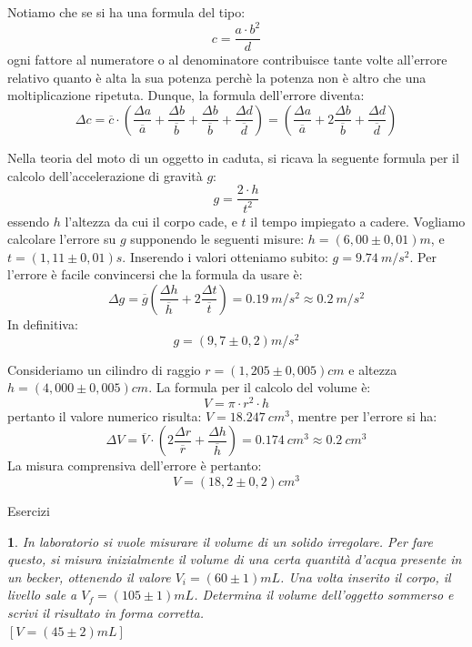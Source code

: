 \documentclass[12pt,a4paper,oneside]{book}
\makeatletter
\newcounter{testexample} %
\renewcommand{\subsection}{\@startsection {subsection}{2}{\z@}
{-3ex \@plus -0.1ex \@minus -.4ex}
{0.5ex \@plus.2ex }
{\color[rgb]{0.141,0.596,0.749}\normalfont\sffamily\bfseries}}
\theoremstyle{esercizio}
\newtheorem{esercizio}{}
\makeatother
\begin{document}
Notiamo che se si ha una formula del tipo:
\[
c=\frac{a\cdot b^2}{d}
\]
ogni fattore al numeratore o al denominatore contribuisce tante volte all'errore relativo quanto è alta la sua potenza perchè la potenza non è altro che una moltiplicazione ripetuta. Dunque, la formula dell'errore diventa:
\[
\Delta c= \overline{c} \cdot \left(\frac{\Delta a}{\overline{a}}+\frac{\Delta b}{\overline{b}} +\frac{\Delta b}{\overline{b}}  +\frac{\Delta d}{\overline{d}} \right)= \left(\frac{\Delta a}{\overline{a}}+2\frac{\Delta b}{\overline{b}}  +\frac{\Delta d}{\overline{d}} \right)
\]
\begin{testexample}
Nella teoria del moto di un oggetto in caduta, si ricava la seguente formula per il calcolo dell'accelerazione di gravità $g$:
\[
g=\frac{2\cdot h}{t^2}
\]
essendo $h$ l'altezza da cui il corpo cade, e $t$ il tempo impiegato a cadere. Vogliamo calcolare l'errore su $g$ supponendo le seguenti misure: $h=\left(6,00 \pm 0,01\right)\si{m}$, e $t=\left(1,11\pm 0,01\right)\si{s}$. Inserendo i valori otteniamo subito: $g = \SI{9,74}{m/s^2}$.
Per l'errore è facile convincersi che la formula da usare è:
\[
\Delta g= \overline{g}\left(\frac{\Delta h}{\overline{h}} +2\frac{\Delta t}{\overline{t}}\right)=\SI{0,19}{m/s^2}\approx \SI{0,2}{m/s^2}
\]
In definitiva:
\[
g=\left(9,7 \pm 0,2\right)\si{m/s^2}
\]
\end{testexample}
\begin{testexample}
Consideriamo un cilindro di raggio $r=\left(1,205 \pm 0,005\right)\si{cm}$ e altezza $h=\left(4,000 \pm 0,005 \right)\si{cm}$. La formula per il calcolo del volume è:
\[
V=\pi\cdot  r^2 \cdot h
\]
pertanto il valore numerico risulta: $V =\SI{18,247}{cm^3}$, mentre per l'errore si ha:
\[
\Delta V=\overline{V}\cdot \left(2\frac{\Delta r}{\overline{r}} +\frac{\Delta h}{\overline{h}}\right)=\SI{0,174}{cm^3}\approx \SI{0,2}{cm^3}
\]
La misura comprensiva dell'errore è pertanto:
\[
V=\left(18,2 \pm 0,2\right)\si{cm^3}
\]
\end{testexample}


\subsection{Esercizi}
\begin{esercizio}
In laboratorio si vuole misurare il volume di un solido irregolare. Per fare questo, si misura inizialmente il volume di una certa quantità d'acqua presente in un becker, ottenendo il valore  $V_i=\left(60 \pm 1\right)\si{mL}$. Una volta inserito il corpo, il livello sale a $V_f=\left(105 \pm 1\right)\si{mL}$. Determina il volume dell'oggetto sommerso e scrivi il risultato in forma corretta.\\
 \hspace*{\fill}  $\left[V=\left(45 \pm 2\right)\si{mL}\right]$
\end{esercizio}
\end{document}
